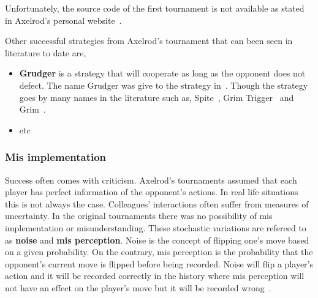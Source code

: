 \documentclass{article}
\begin{document}
Unfortunately, the source code of the first tournament is not 
available as stated in Axelrod's personal website~\cite{fortan_code}.

Other successful strategies from Axelrod's tournament that can been seen 
in literature to date are, 

\begin{itemize}
    \item \textbf{Grudger} is a strategy that will cooperate as long as the 
    opponent does not defect. The name Grudger was give to the strategy in~\cite{Li2014}.
    Though the strategy goes by many names in the literature such as, 
    Spite~\cite{Beaufils1997}, Grim Trigger~\cite{Banks1990} and Grim~\cite{Van2015}.
    \item etc
\end{itemize}


\subsubsection{Mis implementation}

Success often comes with criticism. Axelrod's tournaments assumed that
each player has perfect information of the opponent's actions. In real life
situations this is not always the case. Colleagues' interactions often suffer from
measures of uncertainty. In the original tournaments there was no possibility of
mis implementation or misunderstanding. These stochastic variations are refereed
to as \textbf{noise} and \textbf{mis perception}. Noise is the concept of flipping
one's move based on a given probability. On the contrary, mis perception is the
probability that the opponent's current move is flipped before being recorded.
Noise will flip a player's action  and it will be recorded correctly in the history
where mis perception will not have an effect on the player's move but it will be
recorded wrong~\cite{Hoffmann1998}.
\end{document}
